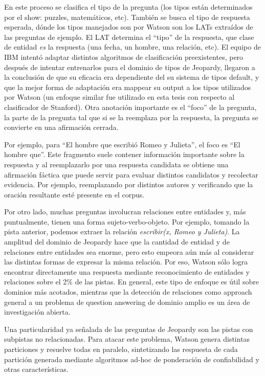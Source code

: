 En este proceso se clasifica el tipo de la pregunta (los tipos est\'an
determinados por el show: puzzles, matem\'aticos, etc). Tambi\'en se
busca el tipo de respuesta esperada, d\'onde los tipos manejados son
por Watson son los LATs extra\'idos de las preguntas de ejemplo. El LAT
determina el {\textquotedblleft}tipo{\textquotedblright} de la
respuesta, que clase de entidad \textit{es} la respuesta (una fecha, un
hombre, una relaci\'on, etc). El equipo de IBM intent\'o adaptar
distintos algoritmos de clasificaci\'on preexistentes, pero despu\'es
de intentar entrenarlos para el dominio de tipos de Jeopardy, llegaron
a la conclusi\'on de que su eficacia era dependiente del su sistema de
tipos default, y que la mejor forma de adaptaci\'on era mappear su
output a los tipos utilizados por Watson (un enfoque similar fue
utilizado en esta tesis con respecto al clasificador de Stanford). Otra
anotaci\'on importante es el
{\textquotedblleft}foco{\textquotedblright} de la pregunta, la parte de
la pregunta tal que si se la reemplaza por la respuesta, la pregunta se
convierte en una afirmaci\'on cerrada.

Por ejemplo, para {\textquotedblleft}El hombre que escribi\'o Romeo y
Julieta{\textquotedblright}, el foco es {\textquotedblleft}El hombre
que{\textquotedblright}. Este fragmento suele contener informaci\'on
importante sobre la respuesta y al reemplazarlo por una respuesta
candidata se obtiene una afirmaci\'on f\'actica que puede servir para
evaluar distintos candidatos y recolectar evidencia. Por ejemplo,
reemplazando por distintos autores y verificando que la oraci\'on
resultante est\'e presente en el corpus.

Por otro lado, muchas preguntas involucran relaciones entre entidades y,
m\'as puntualmente, tienen una forma sujeto-verbo-objeto. Por ejemplo,
tomando la pista anterior, podemos extraer la relaci\'on
\textit{escribir(x, Romeo y Julieta)}. La amplitud del dominio de
Jeopardy hace que la cantidad de entidad y de relaciones entre
entidades sea enorme, pero esto empeora a\'un m\'as al considerar las
distintas formas de expresar la misma relaci\'on. Por eso, Watson
s\'olo logra encontrar directamente una respuesta mediante
reconocimiento de entidades y relaciones sobre el 2\% de las pistas. En
general, este tipo de enfoque es \'util sobre dominios m\'as acotados,
mientras que la detecci\'on de relaciones como approach general a un
problema de question answering de dominio amplio es un \'area de
investigaci\'on abierta. 

Una particularidad ya se\~nalada de las preguntas de Jeopardy son las
pistas con subpistas no relacionadas. Para atacar este problema, Watson
genera distintas particiones y resuelve todas en paralelo, sintetizando
las respuesta de cada partici\'on generada mediante algoritmos ad-hoc
de ponderaci\'on de confiabilidad y otras caracter\'isticas.

